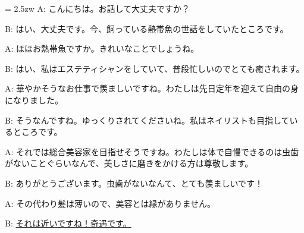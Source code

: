 \documentclass[11pt]{amsart}
\title{}
\author{}
\newenvironment{hangall}[1]{\hangindent = 2.5zw\everypar{\hangindent = 2.5zw}}{}
\begin{document}
\maketitle
\begin{hangall}{}%
A: こんにちは。お話して大丈夫ですか？

B: はい、大丈夫です。今、飼っている熱帯魚の世話をしていたところです。

A: ほほお熱帯魚ですか。きれいなことでしょうね。

B: はい、私はエステティシャンをしていて、普段忙しいのでとても癒されます。

A: 華やかそうなお仕事で羨ましいですね。わたしは先日定年を迎えて自由の身になりました。

B: そうなんですね。ゆっくりされてくださいね。私はネイリストも目指しているところです。

A: それでは総合美容家を目指せそうですね。わたしは体で自慢できるのは虫歯がないことぐらいなんで、美しさに磨きをかける方は尊敬します。

B: ありがとうございます。虫歯がないなんて、とても羨ましいです！

A: その代わり髪は薄いので、美容とは縁がありません。

B: \ul{それは近いですね！奇遇です。}\end{hangall}
\end{document}
